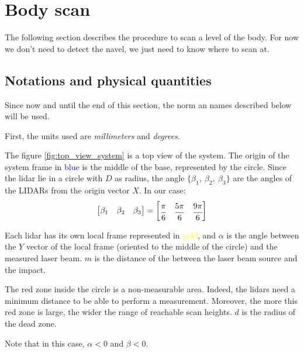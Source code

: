 \documentclass{article}
\newcommand{\vsp}{\vspace{\baselineskip}}
\begin{document}
\section{Body scan}

The following section describes the procedure to scan a level of the body. For now we don't need to detect the navel, we just need to know where to scan at.

\subsection{Notations and physical quantities} \label{sec:notations}

Since now and until the end of this section, the norm an names described below will be used. 

\vsp

First, the units used are \textit{millimeters} and \textit{degrees}.

\vsp

The figure \ref{fig:top_view_system} is a top view of the system. The origin of the system frame in \textcolor{blue}{blue} is the middle of the base, represented by the circle. Since the lidar lie in a circle with $D$ as radius, the angle $\{ \beta_1,\ \beta_2,\ \beta_3 \}$ are the angles of the LIDARs from the origin vector $X$. In our case:
$$
\begin{bmatrix}
    \beta_1 &
    \beta_2 & 
    \beta_3 
\end{bmatrix}
=
\begin{bmatrix}
    \cfrac{ \pi}{6} &
    \cfrac{5\pi}{6} & 
    \cfrac{9\pi}{6} 
\end{bmatrix}
$$

\vsp

Each lidar has its own local frame represented in \textcolor{yellow}{gold}, and $\alpha$ is the angle between the $Y$ vector of the local frame (oriented to the middle of the circle) and the measured laser beam. $m$ is the distance of the between the laser beam source and the impact.

\vsp

The red zone inside the circle is a non-measurable area. Indeed, the lidars need a minimum distance to be able to perform a measurement. Moreover, the more this red zone is large, the wider the range of reachable scan heights. $d$ is the radius of the dead zone.

\vsp

Note that in this case, $\alpha < 0$ and $\beta < 0$.
\end{document}
